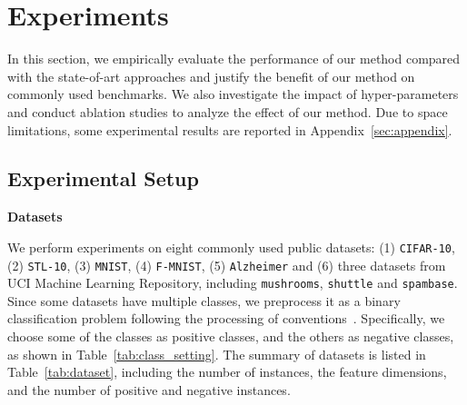 \documentclass[sigconf]{acmart}
\begin{document}
\section{Experiments}
In this section, we empirically evaluate the performance of our method compared with the state-of-art approaches and justify the benefit of our method on commonly used benchmarks. We also investigate the impact of hyper-parameters and conduct ablation studies to analyze the effect of our method.
Due to space limitations, some experimental results are reported in Appendix~\ref{sec:appendix}.

\subsection{Experimental Setup}

\textbf{Datasets}

We perform experiments on eight commonly used public datasets: (1) \texttt{CIFAR-10}, (2) \texttt{STL-10}, (3) \texttt{MNIST}, (4) \texttt{F-MNIST}, (5) \texttt{Alzheimer} and (6) three datasets from UCI Machine Learning Repository, including \texttt{mushrooms}, \texttt{shuttle} and \texttt{spambase}. Since some datasets have multiple classes, we preprocess it as a binary classification problem following the processing of conventions~\cite{kato2018learning}. Specifically, we choose some of the classes as positive classes, and the others as negative classes, as shown in Table~\ref{tab:class_setting}.
The summary of datasets is listed in Table~\ref{tab:dataset}, including the number of instances, the feature dimensions, and the number of positive and negative instances.
\begin{table}[htbp]
    \caption{Preprocessing of the datasets.}
    \centering
{}
    \label{tab:class_setting}
\end{table}
\end{document}
